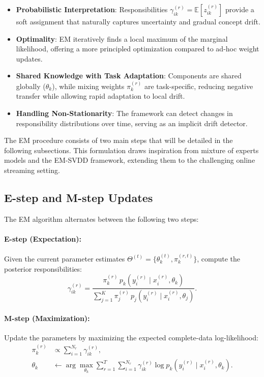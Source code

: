 \documentclass[12pt,a4paper]{article}
\begin{document}
\begin{itemize}
	\item \textbf{Probabilistic Interpretation}: Responsibilities $\gamma_{ik}^{(r)} = \mathbb{E}[z_{ik}^{(r)}]$ provide a soft assignment that naturally captures uncertainty and gradual concept drift.
	\item \textbf{Optimality}: EM iteratively finds a local maximum of the marginal likelihood, offering a more principled optimization compared to ad-hoc weight updates.
	\item \textbf{Shared Knowledge with Task Adaptation}: Components are shared globally ($\theta_k$), while mixing weights $\pi_k^{(r)}$ are task-specific, reducing negative transfer while allowing rapid adaptation to local drift.
	\item \textbf{Handling Non-Stationarity}: The framework can detect changes in responsibility distributions over time, serving as an implicit drift detector.
\end{itemize}

The EM procedure consists of two main steps that will be detailed in the following subsections. This formulation draws inspiration from mixture of experts models and the EM-SVDD framework, extending them to the challenging online streaming setting.





\subsection{E-step and M-step Updates}

The EM algorithm alternates between the following two steps:

\paragraph{E-step (Expectation):} Given the current parameter estimates $\Theta^{(t)} = \{\theta_k^{(t)}, \pi_k^{(r,t)}\}$, compute the posterior responsibilities:
\begin{equation}
	\gamma_{ik}^{(r)} = \frac{\pi_k^{(r)} \, p_k(y_i^{(r)} \mid x_i^{(r)}, \theta_k)}{\sum_{j=1}^K \pi_j^{(r)} \, p_j(y_i^{(r)} \mid x_i^{(r)}, \theta_j)}.
	\label{eq:e-step}
\end{equation}

\paragraph{M-step (Maximization):} Update the parameters by maximizing the expected complete-data log-likelihood:
\begin{align}
	\pi_k^{(r)} &\propto \sum_{i=1}^{N_r} \gamma_{ik}^{(r)}, \\
	\theta_k &\leftarrow \arg\max_{\theta_k} \sum_{r=1}^T \sum_{i=1}^{N_r} \gamma_{ik}^{(r)} \log p_k(y_i^{(r)} \mid x_i^{(r)}, \theta_k).
	\label{eq:m-step}
\end{align}
\end{document}
